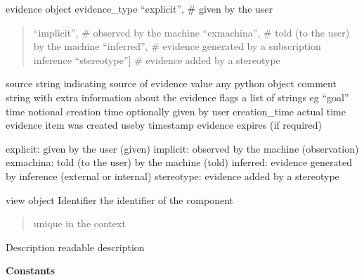 \documentclass[letterpaper,10pt,english]{sphinxmanual}
\begin{document}
\begin{fulllineitems}
\label{API:personis.client.Evidence}
evidence object
evidence\_type   ``explicit'', \# given by the user
\begin{quote}

``implicit'', \# observed by the machine
``exmachina'', \# told (to the user) by the machine
``inferred'', \# evidence generated by a subscription inference 
``stereotype''{]} \# evidence added by a stereotype
\end{quote}

source  string indicating source of evidence
value   any python object
comment string with extra information about the evidence
flags   a list of strings eg ``goal''
time    notional creation time optionally given by user
creation\_time actual time evidence item was created
useby   timestamp evidence expires (if required)

\begin{fulllineitems}
\label{API:personis.client.Evidence.EvidenceTypes}
explicit: given by the user  (given)
implicit: observed by the machine (observation)
exmachina: told (to the user) by the machine (told)
inferred: evidence generated by inference (external or internal)
stereotype: evidence added by a stereotype

\end{fulllineitems}


\end{fulllineitems}


\begin{fulllineitems}
\label{API:personis.client.View}
view object
Identifier  the identifier of the component
\begin{quote}

unique in the context
\end{quote}

Description readable description

\end{fulllineitems}


\textbf{Constants}
\end{document}
